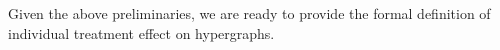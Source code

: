 
Given the above preliminaries, %
we are ready to provide the formal definition of individual treatment effect on hypergraphs.

